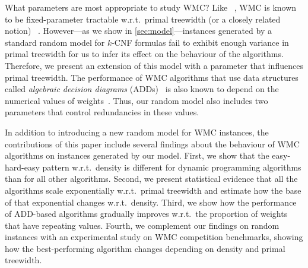 \documentclass[runningheads]{llncs}
\begin{document}
What parameters are most appropriate to study \textsf{WMC}? Like
\SAT{}~\cite{DBLP:journals/jair/AtseriasFT11}, \textsf{WMC} is known to be
fixed-parameter tractable w.r.t.\ primal treewidth (or a closely related notion)
~\cite{DBLP:journals/jair/BacchusDP09,DBLP:journals/jacm/Darwiche01,DBLP:conf/ecai/Darwiche04,DBLP:conf/sat/SangBBKP04}.
However---as we show in \cref{sec:model}---instances generated by a standard
random model for $k$-CNF formulas fail to exhibit enough variance in primal
treewidth for us to infer its effect on the behaviour of the algorithms.
Therefore, we present an extension of this model with a parameter that
influences primal treewidth. The performance of \textsf{WMC} algorithms that use
data structures called \emph{algebraic decision diagrams}
(ADDs)~\cite{DBLP:journals/fmsd/BaharFGHMPS97} is also known to depend on the
numerical values of
weights~\cite{DBLP:conf/aaai/DudekPV20,DBLP:conf/cp/DudekPV20}. Thus, our random
model also includes two parameters that control redundancies in these values.


In addition to introducing a new random model for \textsf{WMC} instances, the
contributions of this paper include several findings about the behaviour of
\textsf{WMC} algorithms on instances generated by our model. First, we show that
the easy-hard-easy pattern w.r.t.\ density is different for dynamic programming
algorithms than for all other algorithms. Second, we present statistical
evidence that all the algorithms scale exponentially w.r.t.\ primal treewidth
and estimate how the base of that exponential changes w.r.t.\ density. Third, we
show how the performance of ADD-based algorithms gradually improves w.r.t.\ the
proportion of weights that have repeating values. Fourth, we complement our
findings on random instances with an experimental study on \textsf{WMC}
competition benchmarks, showing how the best-performing algorithm changes
depending on density and primal treewidth.
\end{document}

